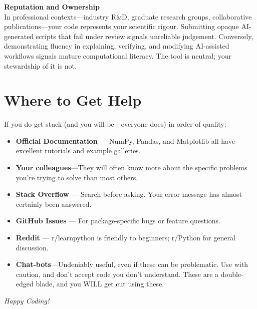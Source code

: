 \begin{warning}
\textbf{Reputation and Ownership} \\
In professional contexts---industry R\&D, graduate research groups, collaborative publications---your code represents your scientific rigour. Submitting opaque AI-generated scripts that fail under review signals unreliable judgement. Conversely, demonstrating fluency in explaining, verifying, and modifying AI-assisted workflows signals mature computational literacy. The tool is neutral; your stewardship of it is not.
\end{warning}

\section{Where to Get Help}
If you do get stuck (and you will be---everyone does) in order of quality:
\begin{itemize}
    \item \textbf{Official Documentation} --- NumPy, Pandas, and Matplotlib all have excellent tutorials and example galleries.
	\item \textbf{Your colleagues}---They will often know more about the specific problems you're trying to solve than most others.
    \item \textbf{Stack Overflow} --- Search before asking. Your error message has almost certainly been answered.
    \item \textbf{GitHub Issues} --- For package-specific bugs or feature questions.
    \item \textbf{Reddit} --- r/learnpython is friendly to beginners; r/Python for general discussion.
	\item \textbf{Chat-bots}---Undeniably useful, even if these can be problematic. Use with caution, and don't accept code you don't understand. These are a double-edged blade, and you WILL get cut using these.
\end{itemize}

\vfill
\begin{center}
    \textit{Happy Coding!}
\end{center}
